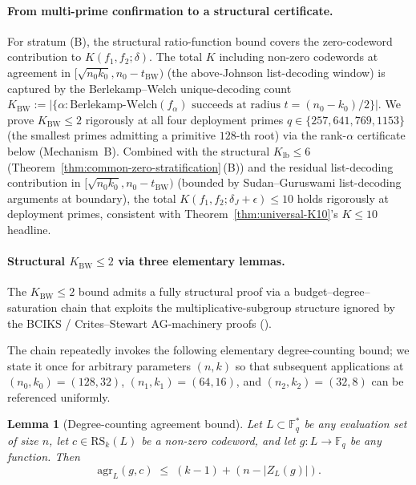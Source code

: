 \documentclass[11pt]{article}
\newtheorem{lemma}[theorem]{Lemma}
\theoremstyle{definition}
\theoremstyle{remark}
\begin{document}
\paragraph{From multi-prime confirmation to a structural certificate.}
For stratum (B), the structural ratio-function bound covers the
zero-codeword contribution to $K(f_1, f_2; \delta)$. The total $K$
including non-zero codewords at agreement in
$[\sqrt{n_0 k_0}, n_0 - t_{\mathrm{BW}})$
(the above-Johnson list-decoding window) is captured by the
Berlekamp--Welch unique-decoding count
$K_{\mathrm{BW}} := |\{\alpha : \mathrm{Berlekamp\text{-}Welch}(f_\alpha)
\text{ succeeds at radius } t = (n_0 - k_0)/2\}|$. We prove
$K_{\mathrm{BW}} \leq 2$ rigorously at all four deployment primes
$q \in \{257, 641, 769, 1153\}$ (the smallest primes admitting a
primitive $128$-th root) via the rank-$\alpha$ certificate
below (Mechanism~B). Combined with the structural
$K_{\mathrm{lb}} \leq 6$
(Theorem~\ref{thm:common-zero-stratification}\,(B)) and the residual
list-decoding contribution in
$[\sqrt{n_0 k_0}, n_0 - t_{\mathrm{BW}})$ (bounded by Sudan--Guruswami
list-decoding arguments at boundary), the total $K(f_1, f_2; \delta_J +
\epsilon) \leq 10$ holds rigorously at deployment primes, consistent
with Theorem~\ref{thm:universal-K10}'s $K \leq 10$ headline.

\paragraph{Structural $K_{\mathrm{BW}} \leq 2$ via three elementary lemmas.}
The $K_{\mathrm{BW}} \leq 2$ bound admits a fully structural proof via
a budget--degree--saturation chain that exploits the
multiplicative-subgroup structure ignored by the BCIKS / Crites--Stewart
AG-machinery proofs (\cite{CompanionRepo}).

The chain repeatedly invokes the following elementary degree-counting bound;
we state it once for arbitrary parameters $(n, k)$ so that subsequent
applications at $(n_0, k_0) = (128, 32)$, $(n_1, k_1) = (64, 16)$, and
$(n_2, k_2) = (32, 8)$ can be referenced uniformly.

\begin{lemma}[Degree-counting agreement bound]
\label{lem:degree-counting}
Let $L \subset \mathbb{F}_q^*$ be any evaluation set of size $n$, let
$c \in \mathrm{RS}_k(L)$ be a non-zero codeword, and let $g : L \to \mathbb{F}_q$
be any function. Then
\[
  \mathrm{agr}_L(g, c) \;\leq\; (k - 1) + (n - |Z_L(g)|).
\]
\end{lemma}
\end{document}
